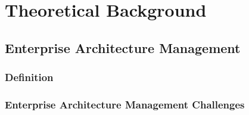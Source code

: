 
\chapter{Theoretical Background}\label{chapter:theoretical background}

\section{Enterprise Architecture Management} 

\subsection{Definition}



\subsection{Enterprise Architecture Management Challenges}








